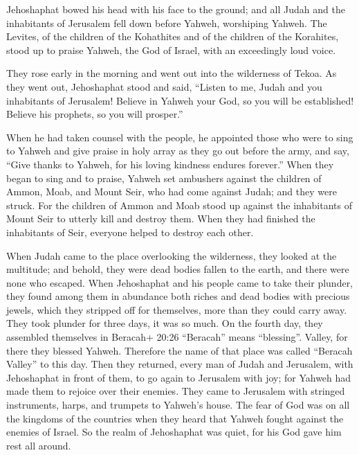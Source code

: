 Jehoshaphat bowed his head with his face to the ground;
and all Judah and the inhabitants of Jerusalem fell down before Yahweh,
worshiping Yahweh.  The Levites, of the children of the
Kohathites and of the children of the Korahites, stood up to praise
Yahweh, the God of Israel, with an exceedingly loud voice.

 They rose early in the morning and went out into the
wilderness of Tekoa. As they went out, Jehoshaphat stood and said,
``Listen to me, Judah and you inhabitants of Jerusalem! Believe in
Yahweh your God, so you will be established! Believe his prophets, so
you will prosper.''

 When he had taken counsel with the people, he appointed
those who were to sing to Yahweh and give praise in holy array as they
go out before the army, and say, ``Give thanks to Yahweh, for his loving
kindness endures forever.''  When they began to sing and to
praise, Yahweh set ambushers against the children of Ammon, Moab, and
Mount Seir, who had come against Judah; and they were struck.
 For the children of Ammon and Moab stood up against the
inhabitants of Mount Seir to utterly kill and destroy them. When they
had finished the inhabitants of Seir, everyone helped to destroy each
other.

 When Judah came to the place overlooking the wilderness,
they looked at the multitude; and behold, they were dead bodies fallen
to the earth, and there were none who escaped.  When
Jehoshaphat and his people came to take their plunder, they found among
them in abundance both riches and dead bodies with precious jewels,
which they stripped off for themselves, more than they could carry away.
They took plunder for three days, it was so much.  On the
fourth day, they assembled themselves in Beracah+ 20:26 ``Beracah''
means ``blessing''. Valley, for there they blessed Yahweh. Therefore the
name of that place was called ``Beracah Valley'' to this day.
 Then they returned, every man of Judah and Jerusalem, with
Jehoshaphat in front of them, to go again to Jerusalem with joy; for
Yahweh had made them to rejoice over their enemies.  They
came to Jerusalem with stringed instruments, harps, and trumpets to
Yahweh's house.  The fear of God was on all the kingdoms of
the countries when they heard that Yahweh fought against the enemies of
Israel.  So the realm of Jehoshaphat was quiet, for his God
gave him rest all around.

